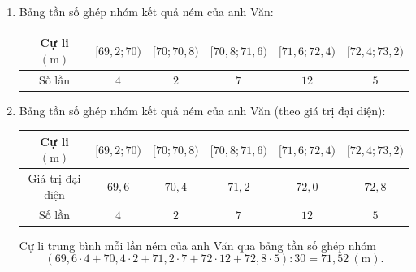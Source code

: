\begin{vd}
{\begin{enumerate}
\begin{center}
\begin{tabular}{|c|c|c|c|c|c|c|c|c|c|c|}
					\hline $71{,}6$ & $71{,}3$ & $72{,}2$ & $71{,}8$ & $70{,}8$ & $72{,}2$ & $72{,}2$ & $72{,}9$ & $72{,}7$ & $70{,}7$ &$718{,}4$\\
					\hline
				\end{tabular}
			\end{center}
			Cự li trung bình của mỗi lần ném của anh Văn
			\[\overline{x}=\dfrac{713{,}6+714{,}9+718{,}4}{30}\approx71{,}56\ (\mathrm{m}). \]
			\item Bảng tần số ghép nhóm kết quả ném của anh Văn:
			\begin{center}
				\begin{tabular}{|c|c|c|c|c|c|}
					\hline Cự li $(\mathrm{m})$ &{$[69{,}2; 70)$} &{$[70; 70{,}8)$} &{$[70{,}8; 71{,}6)$} &{$[71{,}6; 72{,}4)$} &{$[72{,}4; 73{,}2)$} \\
					\hline Số lần & $4$ & $2$ & $7$ & $12$ & $5$ \\
					\hline
				\end{tabular}
			\end{center}
			\item Bảng tần số ghép nhóm kết quả ném của anh Văn (theo giá trị đại diện):
			\begin{center}
				\begin{tabular}{|c|c|c|c|c|c|}
					\hline Cự li $(\mathrm{m})$ &{$[69{,}2; 70)$} &{$[70; 70{,}8)$} &{$[70{,}8; 71{,}6)$} &{$[71{,}6; 72{,}4)$} &{$[72{,}4; 73{,}2)$} \\
					\hline Giá trị đại diện &$69{,}6$ &$70{,}4$ &$71{,}2$ &$72{,}0$ &$72{,}8$\\
					\hline Số lần & $4$ & $2$ & $7$ & $12$ & $5$ \\
					\hline
				\end{tabular}
			\end{center}
			Cự li trung bình mỗi lần ném của anh Văn qua bảng tần số ghép nhóm
			\[(69{,}6\cdot 4+70{,}4\cdot 2+71{,}2\cdot 7+72\cdot 12+72{,}8\cdot 5):30=71{,}52\ (\mathrm{m}).  \]
		\end{enumerate}
	}
\end{vd}

